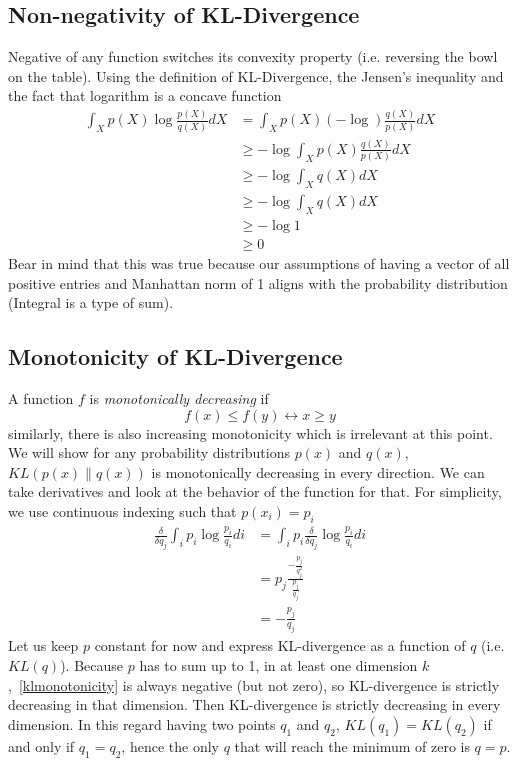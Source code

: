 \documentclass{article}
\numberwithin{equation}{subsection}
\begin{document}
\subsection{Non-negativity of KL-Divergence}
\label{kl_nonneg}
Negative of any function switches its convexity property (i.e. reversing the bowl on the table). Using the definition of KL-Divergence, the Jensen's inequality and the fact that logarithm is a concave function 
\begin{align}
     \int_X p(X)\log\frac{p(X)}{q(X)} dX &= \int_X p(X)(-\log)\frac{q(X)}{p(X)} dX\\
     &\geq -\log \int_X p(X)\frac{q(X)}{p(X)} dX\\
     &\geq -\log \int_X q(X) dX\\
     &\geq -\log \int_X q(X) dX\\
     &\geq -\log 1 \\
     &\geq 0
\end{align}
Bear in mind that this was true because our assumptions of having a vector of all positive entries and Manhattan norm of 1 aligns with the probability distribution (Integral is a type of sum).
\subsection{Monotonicity of KL-Divergence}
A function $f$ is \textit{monotonically decreasing} if
\begin{equation}
    f(x) \leq f(y) \longleftrightarrow x \geq y
\end{equation}
similarly, there is also increasing monotonicity which is irrelevant at this point. We will show for any probability distributions $p(x)$ and $q(x)$, $KL(p(x)\parallel q(x))$ is monotonically decreasing in every direction. We can take derivatives and look at the behavior of the function for that. For simplicity, we use continuous indexing such that $p(x_i)=p_i$ 
\begin{align}
    \frac{\delta}{\delta q_j}\int_i p_i\log\frac{p_i}{q_i} di &= \int_i p_i\frac{\delta}{\delta q_j}\log\frac{p_i}{q_i} di\\
    &= p_j\frac{-\frac{p_j}{q_j^2}}{\frac{p_j}{q_j}}\\
    &= -\frac{p_j}{q_j} \label{klmonotonicity}
\end{align}
Let us keep $p$ constant for now and express KL-divergence as a function of $q$ (i.e. $KL(q)$). Because $p$ has to sum up to 1, in at least one dimension $k$,~\ref{klmonotonicity} is always negative (but not zero), so KL-divergence is strictly decreasing in that dimension. Then KL-divergence is strictly decreasing in every dimension. In this regard having two points $q_1$ and $q_2$, $KL(q_1)=KL(q_2)$ if and only if $q_1=q_2$, hence the only $q$ that will reach the minimum of zero is $q=p$.
\end{document}
